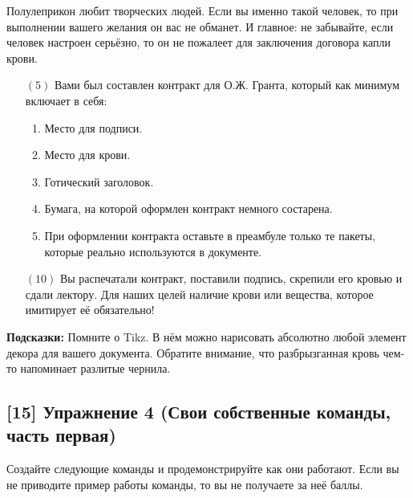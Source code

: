 \documentclass[12pt, a4paper, oneside]{article}
\begin{document}
Полулеприкон любит творческих людей. Если вы именно такой человек, то при выполнении вашего желания он вас не обманет. И главное: не забывайте, если человек настроен серьёзно, то он не пожалеет для заключения договора капли крови.

\begin{itemize}
	\item[$(5)$]   Вами был составлен контракт для О.Ж. Гранта, который как минимум включает в себя:
	
	\begin{enumerate}
		\item  Место для подписи.
		\item  Место для крови.
		\item  Готический заголовок.
		\item  Бумага, на которой оформлен контракт немного состарена.
		\item  При оформлении контракта оставьте в преамбуле только те пакеты, которые реально используются в документе.
	\end{enumerate}
	
	\item[$(10)$] Вы распечатали контракт, поставили подпись, скрепили его кровью и сдали лектору. Для наших целей наличие крови или вещества, которое имитирует её обязательно!
\end{itemize}

\textbf{Подсказки:}  Помните о Tikz. В нём можно нарисовать абсолютно любой элемент декора для вашего документа. Обратите внимание, что разбрызганная кровь чем-то напоминает разлитые чернила.


\subsection*{[15]  Упражнение 4 (Свои собственные команды, часть первая)}

Создайте следующие команды и продемонстрируйте как они работают. Если вы не приводите пример работы команды, то вы не получаете за неё баллы.
\end{document}
